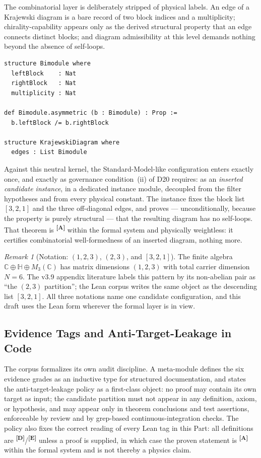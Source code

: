 \documentclass[12pt,a4paper,twoside]{article}
\theoremstyle{plain}
\theoremstyle{definition}
\theoremstyle{remark}
\newtheorem{remark}[theorem]{Remark}
\newcommand{\catmark}[1]{\textsuperscript{\textsf{\textbf{[#1]}}}}
\begin{document}
The combinatorial layer is deliberately stripped of physical labels. An
edge of a Krajewski diagram is a bare record of two block indices and a
multiplicity; chirality-capability appears only as the derived structural
property that an edge connects distinct blocks; and diagram admissibility
at this level demands nothing beyond the absence of self-loops.

\begin{lstlisting}
structure Bimodule where
  leftBlock    : Nat
  rightBlock   : Nat
  multiplicity : Nat

def Bimodule.asymmetric (b : Bimodule) : Prop :=
  b.leftBlock /= b.rightBlock

structure KrajewskiDiagram where
  edges : List Bimodule
\end{lstlisting}

Against this neutral kernel, the Standard-Model-like configuration enters
exactly once, and exactly as governance condition~(ii) of D20 requires: as
an \emph{inserted candidate instance}, in a dedicated instance module,
decoupled from the filter hypotheses and from every physical constant. The
instance fixes the block list $[3,2,1]$ and the three off-diagonal edges,
and proves --- unconditionally, because the property is purely structural
--- that the resulting diagram has no self-loops. That theorem is
\catmark{A} within the formal system and physically weightless: it
certifies combinatorial well-formedness of an inserted diagram, nothing
more.

\begin{remark}[{Notation: $(1,2,3)$, $(2,3)$, and $[3,2,1]$}]
\label{rem:partition-notation}
The finite algebra $\mathbb C \oplus \mathbb H \oplus M_3(\mathbb C)$ has
matrix dimensions $(1,2,3)$ with total carrier dimension $N = 6$. The
v3.9 appendix literature labels this pattern by its non-abelian pair as
``the $(2,3)$ partition''; the Lean corpus writes the same object as the
descending list $[3,2,1]$. All three notations name one candidate
configuration, and this draft uses the Lean form wherever the formal layer
is in view.
\end{remark}

\subsection{Evidence Tags and Anti-Target-Leakage in Code}
\label{subsec:code-evidence}

The corpus formalizes its own audit discipline. A meta-module defines the
six evidence grades as an inductive type for structured documentation, and
states the anti-target-leakage policy as a first-class object: no proof
may contain its own target as input; the candidate partition must not
appear in any definition, axiom, or hypothesis, and may appear only in
theorem conclusions and test assertions, enforceable by review and by
grep-based continuous-integration checks. The policy also fixes the
correct reading of every Lean tag in this Part: all definitions are
\catmark{D}/\catmark{E} unless a proof is supplied, in which case the
proven statement is \catmark{A} within the formal system and is not
thereby a physics claim.
\end{document}
